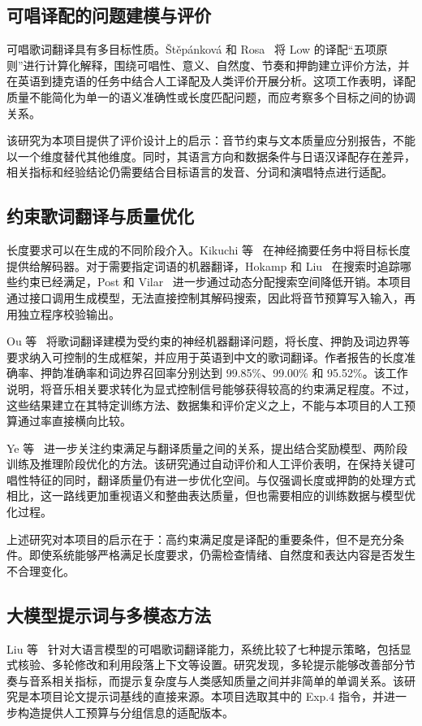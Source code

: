 \documentclass[12pt, a4paper]{ctexart}
\numberwithin{table}{section}
\numberwithin{figure}{section}
\begin{document}
\subsection{可唱译配的问题建模与评价}
可唱歌词翻译具有多目标性质。Štěpánková 和 Rosa~\cite{stepankova-rosa-2025-song} 将 Low 的译配“五项原则”进行计算化解释，围绕可唱性、意义、自然度、节奏和押韵建立评价方法，并在英语到捷克语的任务中结合人工译配及人类评价开展分析。这项工作表明，译配质量不能简化为单一的语义准确性或长度匹配问题，而应考察多个目标之间的协调关系。

该研究为本项目提供了评价设计上的启示：音节约束与文本质量应分别报告，不能以一个维度替代其他维度。同时，其语言方向和数据条件与日语汉译配存在差异，相关指标和经验结论仍需要结合目标语言的发音、分词和演唱特点进行适配。

\subsection{约束歌词翻译与质量优化}
长度要求可以在生成的不同阶段介入。Kikuchi 等~\cite{kikuchi-etal-2016-controlling} 在神经摘要任务中将目标长度提供给解码器。对于需要指定词语的机器翻译，Hokamp 和 Liu~\cite{hokamp-liu-2017-lexically} 在搜索时追踪哪些约束已经满足，Post 和 Vilar~\cite{post-vilar-2018-fast} 进一步通过动态分配搜索空间降低开销。本项目通过接口调用生成模型，无法直接控制其解码搜索，因此将音节预算写入输入，再用独立程序校验输出。

Ou 等~\cite{ou-etal-2023-songs} 将歌词翻译建模为受约束的神经机器翻译问题，将长度、押韵及词边界等要求纳入可控制的生成框架，并应用于英语到中文的歌词翻译。作者报告的长度准确率、押韵准确率和词边界召回率分别达到 99.85\%、99.00\% 和 95.52\%。该工作说明，将音乐相关要求转化为显式控制信号能够获得较高的约束满足程度。不过，这些结果建立在其特定训练方法、数据集和评价定义之上，不能与本项目的人工预算通过率直接横向比较。

Ye 等~\cite{ye-etal-2024-sing} 进一步关注约束满足与翻译质量之间的关系，提出结合奖励模型、两阶段训练及推理阶段优化的方法。该研究通过自动评价和人工评价表明，在保持关键可唱性特征的同时，翻译质量仍有进一步优化空间。与仅强调长度或押韵的处理方式相比，这一路线更加重视语义和整曲表达质量，但也需要相应的训练数据与模型优化过程。

上述研究对本项目的启示在于：高约束满足度是译配的重要条件，但不是充分条件。即使系统能够严格满足长度要求，仍需检查情绪、自然度和表达内容是否发生不合理变化。

\subsection{大模型提示词与多模态方法}
Liu 等~\cite{hanze-etal-2026-towards} 针对大语言模型的可唱歌词翻译能力，系统比较了七种提示策略，包括显式核验、多轮修改和利用段落上下文等设置。研究发现，多轮提示能够改善部分节奏与音系相关指标，而提示复杂度与人类感知质量之间并非简单的单调关系。该研究是本项目论文提示词基线的直接来源。本项目选取其中的 Exp.4 指令，并进一步构造提供人工预算与分组信息的适配版本。
\end{document}
